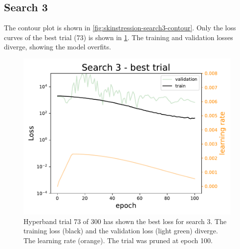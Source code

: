 \subsection{Search 3}
The contour plot is shown in \cref{fig:skinstression-search3-contour}.
Only the loss curves of the best trial (73) is shown in \cref{fig:skinstression-search3-best-loss}.
The training and validation losses diverge, showing the model overfits.

\begin{figure}
    \centering
    \includegraphics[]{skinstression/images/hyperparameter-search/search-3/best-trial-loss.pdf}
    \caption[Best loss curve of search 3]{
        Hyperband trial 73 of 300 has shown the best loss for search 3.
        The training loss (black) and the validation loss (light green) diverge.
        The learning rate (orange).
        The trial was pruned at epoch 100.
    }
    \label{fig:skinstression-search3-best-loss}
\end{figure}

